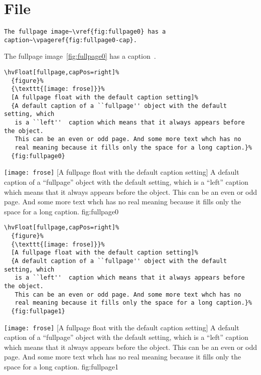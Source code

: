 \documentclass{scrartcl}
\begin{document}
\blinddocument

\section{File \texttt{\jobname}}

\begin{lstlisting}
The fullpage image~\vref{fig:fullpage0} has a caption~\vpageref{fig:fullpage0-cap}.
\end{lstlisting}

The fullpage image~\vref{fig:fullpage0} has a caption~.

\begin{lstlisting}
\hvFloat[fullpage,capPos=right]%
  {figure}%
  {\texttt{[image: frose]}}%
  [A fullpage float with the default caption setting]%
  {A default caption of a ``fullpage'' object with the default setting, which
   is a ``left''  caption which means that it always appears before the object.
   This can be an even or odd page. And some more text whch has no
   real meaning because it fills only the space for a long caption.}%
  {fig:fullpage0}
\end{lstlisting}


\Float[capPos=right]
%
  {\texttt{[image: frose]}}%
  [A fullpage float with the default caption setting]%
  {A default caption of a ``fullpage'' object with the default setting, which
   is a ``left''  caption which means that it always appears before the object.
   This can be an even or odd page. And some more text whch has no
   real meaning because it fills only the space for a long caption.}%
  {fig:fullpage0}

\Blindtext

\Blindtext

\begin{lstlisting}
\hvFloat[fullpage,capPos=right]%
  {figure}%
  {\texttt{[image: frose]}}%
  [A fullpage float with the default caption setting]%
  {A default caption of a ``fullpage'' object with the default setting, which
   is a ``left''  caption which means that it always appears before the object.
   This can be an even or odd page. And some more text whch has no
   real meaning because it fills only the space for a long caption.}%
  {fig:fullpage1}
\end{lstlisting}


\Float[capPos=right]
%
  {\texttt{[image: frose]}}%
  [A fullpage float with the default caption setting]%
  {A default caption of a ``fullpage'' object with the default setting, which
   is a ``left''  caption which means that it always appears before the object.
   This can be an even or odd page. And some more text whch has no
   real meaning because it fills only the space for a long caption.}%
  {fig:fullpage1}

\blinddocument


\Blindtext
\end{document}
